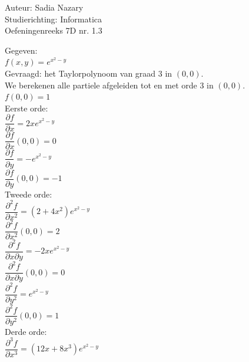 \documentclass[a4paper]{article}
\begin{document}
\noindent \large Auteur: Sadia Nazary \\
\noindent \large Studierichting: Informatica\\
\noindent \large Oefeningenreeks 7D nr. 1.3\\

\medskip

\normalsize

Gegeven:\\

$f(x,y)=e^{x^2-y}$\\

Gevraagd: het Taylorpolynoom van graad $3$ in $(0,0)$.\\

We berekenen alle partiele afgeleiden tot en met orde $3$ in $(0,0)$.\\

$f(0,0)=1$\\

Eerste orde:\\

$\dfrac{\partial f}{\partial x}=2xe^{x^2-y}$\\

$\dfrac{\partial f}{\partial x}(0,0)=0$\\

$\dfrac{\partial f}{\partial y}=-e^{x^2-y}$\\

$\dfrac{\partial f}{\partial y}(0,0)=-1$\\

Tweede orde:\\

$\dfrac{\partial^2 f}{\partial x^2}
=
(2+4x^2)e^{x^2-y}$\\

$\dfrac{\partial^2 f}{\partial x^2}(0,0)=2$\\

$\dfrac{\partial^2 f}{\partial x\partial y}
=
-2xe^{x^2-y}$\\

$\dfrac{\partial^2 f}{\partial x\partial y}(0,0)=0$\\

$\dfrac{\partial^2 f}{\partial y^2}
=
e^{x^2-y}$\\

$\dfrac{\partial^2 f}{\partial y^2}(0,0)=1$\\

Derde orde:\\

$\dfrac{\partial^3 f}{\partial x^3}
=
(12x+8x^3)e^{x^2-y}$\\
\end{document}
